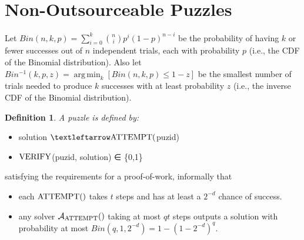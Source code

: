\documentclass{article}
\newtheorem{definition}{Definition}
\DeclareMathOperator*{\argmin}{arg\,min}
\newcommand{\adv}{\mathcal{A}}
\newcommand{\tn}{\textnormal}
\newcommand{\unn}[1]{\uppercase\tn{#1}}
\begin{document}
\section{Non-Outsourceable Puzzles}

Let $Bin(n,k,p) = \sum^k_{i=0}{n \choose i}p^i(1-p)^{n-i}$ be the probability of having $k$ or fewer successes out of $n$ independent trials, each with probability $p$ (i.e., the CDF of the Binomial distribution). Also let $Bin^{-1}(k,p,z) = \displaystyle{\argmin_k}\left[Bin(n,k,p) ≤ 1-z \right]$ be the smallest number of trials needed to produce $k$ successes with at least probability $z$ (i.e., the inverse CDF of the Binomial distribution).

\begin{definition}A puzzle is defined by:
\end{definition}
\begin{itemize}
\item solution $← \unn{attempt}($puzid)
\item  $\unn{verify}$(puzid, solution) ∈ \{0,1\}
\end{itemize}

satisfying the requirements for a proof-of-work, informally that
\begin{itemize}
\item each $\unn{attempt}()$ takes $t$ steps and has at least a $2^{-d}$ chance of success.
\item any solver $\adv_{\unn{attempt}}()$ taking at most $qt$ steps outputs a solution with probability at most $Bin(q,1,2^{-d}) = 1-(1-2^{-d})^q$.
\end{itemize}
\end{document}

